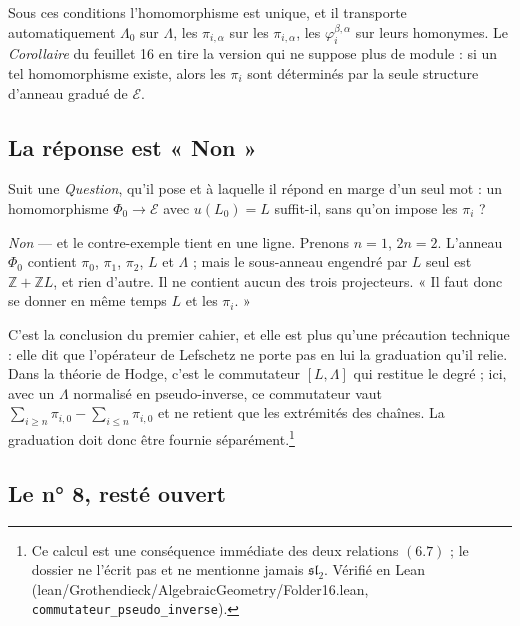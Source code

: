 \documentclass[11pt,a4paper]{article}
\begin{document}
Sous ces conditions l'homomorphisme est unique, et il transporte
automatiquement $\Lambda_{0}$ sur $\Lambda$, les $\pi_{i,\alpha}$ sur les
$\pi_{i,\alpha}$, les $\varphi^{\beta,\alpha}_{i}$ sur leurs homonymes. Le
\emph{Corollaire} du feuillet 16 en tire la version qui ne suppose plus de
module : si un tel homomorphisme existe, alors les $\pi_{i}$ sont déterminés
par la seule structure d'anneau gradué de $\mathcal{E}$.

\subsection*{La réponse est « Non »}

Suit une \emph{Question}, qu'il pose et à laquelle il répond en marge d'un seul
mot : un homomorphisme $\Phi_{0} \to \mathcal{E}$ avec $u(L_{0}) = L$ suffit-il,
sans qu'on impose les $\pi_{i}$ ?

\emph{Non} --- et le contre-exemple tient en une ligne. Prenons
$n = 1$, $2n = 2$. L'anneau $\Phi_{0}$ contient $\pi_{0}$, $\pi_{1}$,
$\pi_{2}$, $L$ et $\Lambda$ ; mais le sous-anneau engendré par $L$ seul est
$\mathbb{Z} + \mathbb{Z}L$, et rien d'autre. Il ne contient aucun des trois
projecteurs. « Il faut donc se donner en même temps $L$ et les $\pi_{i}$. »

C'est la conclusion du premier cahier, et elle est plus qu'une précaution
technique : elle dit que l'opérateur de Lefschetz ne porte pas en lui la
graduation qu'il relie. Dans la théorie de Hodge, c'est le commutateur
$[L, \Lambda]$ qui restitue le degré ; ici, avec un $\Lambda$ normalisé en
pseudo-inverse, ce commutateur vaut
$\sum_{i \geqslant n}\pi_{i,0} - \sum_{i \leqslant n}\pi_{i,0}$ et ne retient
que les extrémités des chaînes. La graduation doit donc être fournie
séparément.\footnote{Ce calcul est une conséquence immédiate des deux
relations $(6.7)$ ; le dossier ne l'écrit pas et ne mentionne jamais
$\mathfrak{sl}_{2}$. Vérifié en Lean (lean/Grothendieck/AlgebraicGeometry/Folder16.lean,
\texttt{commutateur\_pseudo\_inverse}).}

\subsection*{Le n° 8, resté ouvert}
\end{document}
